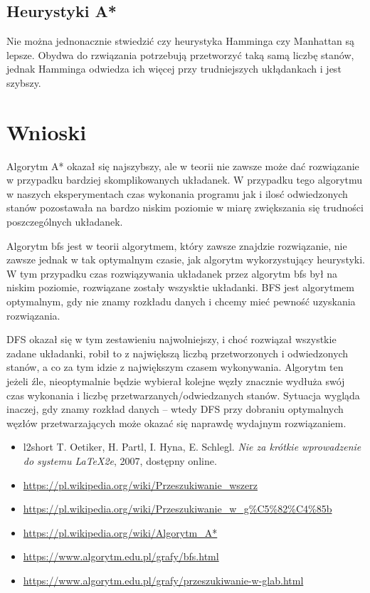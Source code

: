 \documentclass{classrep}
\begin{document}
\subsection{Heurystyki A*}
Nie można jednonacznie stwiedzić czy heurystyka Hamminga czy Manhattan są lepsze.
Obydwa do rzwiązania potrzebują przetworzyć taką samą liczbę stanów, jednak Hamminga odwiedza ich więcej przy trudniejszych ukłądankach i  jest szybszy.

\section{Wnioski}
Algorytm A* okazał się najszybszy, ale w teorii nie zawsze może dać rozwiązanie w przypadku bardziej skomplikowanych układanek. W przypadku tego algorytmu w naszych eksperymentach czas wykonania programu jak i ilosć odwiedzonych stanów pozostawała na bardzo niskim poziomie w miarę zwiększania się trudności poszczególnych układanek. 

Algorytm bfs jest w teorii algorytmem, który zawsze znajdzie rozwiązanie, nie zawsze jednak w tak optymalnym czasie, jak algorytm wykorzystujący heurystyki. W tym przypadku czas rozwiązywania układanek przez algorytm bfs był na niskim poziomie, rozwiązane zostały wszysktie układanki. BFS jest algorytmem optymalnym, gdy nie znamy rozkładu danych i chcemy mieć pewność uzyskania rozwiązania.

DFS okazał się w tym zestawieniu najwolniejszy, i choć rozwiązał wszystkie zadane układanki, robił to z największą liczbą przetworzonych i odwiedzonych stanów, a co za tym idzie z największym czasem wykonywania. Algorytm ten jeżeli źle, nieoptymalnie będzie wybierał kolejne węzły znacznie wydłuża swój czas wykonania i liczbę przetwarzanych/odwiedzanych stanów. Sytuacja wygląda inaczej, gdy znamy rozkład danych – wtedy DFS przy dobraniu optymalnych węzłów przetwarzających może okazać się naprawdę wydajnym rozwiązaniem.
\begin{itemize}
\item{l2short} T. Oetiker, H. Partl, I. Hyna, E. Schlegl. \textsl{Nie za krótkie wprowadzenie do systemu \LaTeX2e}, 2007, dostępny online.
\item \url{https://pl.wikipedia.org/wiki/Przeszukiwanie_wszerz}
\item \url{https://pl.wikipedia.org/wiki/Przeszukiwanie_w_g\%C5\%82\%C4\%85b}
\item \url{https://pl.wikipedia.org/wiki/Algorytm_A*}
\item \url{https://www.algorytm.edu.pl/grafy/bfs.html}
\item \url{https://www.algorytm.edu.pl/grafy/przeszukiwanie-w-glab.html}

\end{itemize}
\end{document}
